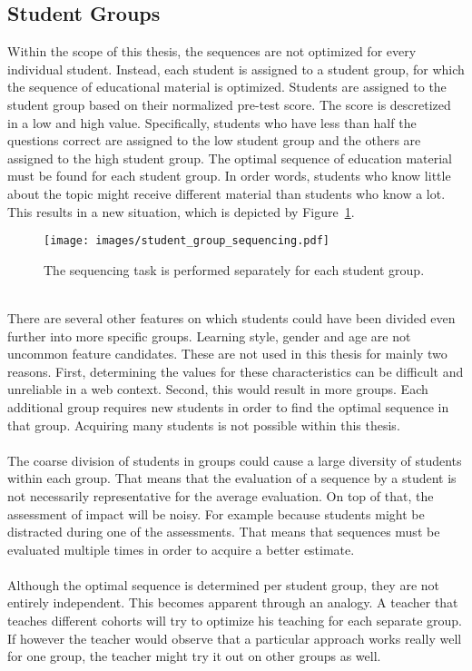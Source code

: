 \subsection{Student Groups}
\label{sec:task_student_groups}
Within the scope of this thesis, the sequences are not optimized for every
individual student. Instead, each student is assigned to a student group, for
which the sequence of educational material is optimized. Students are assigned
to the student group based on their normalized pre-test score. The score is
descretized in a low and high value. Specifically, students who have less than
half the questions correct are assigned to the low student group and the
others are assigned to the high student group. The optimal sequence of education
material must be found for each student group. In order words, students
who know little about the topic might receive different material than students
who know a lot. This results in a new situation, which is depicted by
Figure~\ref{fig:student_group_sequencing}.\\
\begin{figure}[ht]
	\centering
	\texttt{[image: images/student\_group\_sequencing.pdf]}
	\caption[Educational context of the task with student groups]{The
	sequencing task is performed separately for each student group.}
	\label{fig:student_group_sequencing}
\end{figure}\\
\noindent
There are several other features on which students could have been
divided even further into more specific groups. Learning style, gender and age
are not uncommon feature candidates. These are not used in this thesis for
mainly two reasons. First, determining the values for these characteristics can
be difficult and unreliable in a web context. Second, this would result in more
groups. Each additional group requires new students in order to find the
optimal sequence in that group. Acquiring many students is not possible within
this thesis.\\\\
\noindent
The coarse division of students in groups could cause a large diversity of
students within each group. That means that the evaluation of a sequence by a
student is not necessarily representative for the average evaluation. On top of
that, the assessment of impact will be noisy. For example because students
might be distracted during one of the assessments. That means that sequences
must be evaluated multiple times in order to acquire a better estimate.\\\\
\noindent
Although the optimal sequence is determined per student group, they are not
entirely independent. This becomes apparent through an analogy. A teacher that
teaches different cohorts will try to optimize his teaching for each
separate group. If however the teacher would observe that a particular approach
works really well for one group, the teacher might try it out on other groups
as well.

